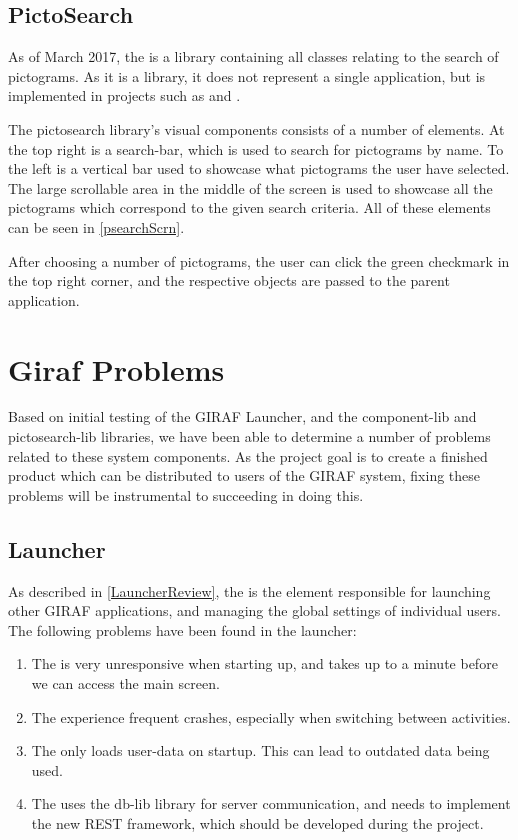 \subsection{PictoSearch}\label{PictoSearchReview}
As of March 2017, the \plib is a library containing all
classes relating to the search of pictograms. As it is a library, it does not
represent a single application, but is implemented in projects such as
\wapp and .\nl

The pictosearch library's visual components consists of a number of
elements. At the top right is a search-bar, which is used to search for
pictograms by name. To the left is a vertical bar used to showcase what
pictograms the user have selected. The large scrollable area in the middle of
the screen is used to showcase all the pictograms which correspond to the given
search criteria. All of these elements can be seen in
\autoref{psearchScrn}.
 

After choosing a number of pictograms, the user can click the green checkmark in
the top right corner, and the respective  objects are passed to
the parent application.

\section{Giraf Problems}\label{GirafProblems}
Based on initial testing of the GIRAF Launcher, and the component-lib and
pictosearch-lib libraries, we have been able to determine a number of problems
related to these system components. As the project goal is to create a finished
product which can be distributed to users of the GIRAF system, fixing these problems
will be instrumental to succeeding in doing this.

\subsection{Launcher}
As described in \autoref{LauncherReview}, the \lapp is the element
responsible for launching other GIRAF applications, and managing the global
settings of individual users. The following problems have been found in the
launcher:
\begin{enumerate}
  \item The \lapp is very unresponsive when starting up, and takes up to a
  minute before we can access the main screen.
  \item The \lapp experience frequent crashes, especially when switching
  between activities.
  \item The \lapp only loads user-data on startup. This can lead to outdated
  data being used.
  \item The \lapp uses the db-lib library for server communication, and needs
  to implement the new REST framework, which should be developed during the project.
\end{enumerate}

